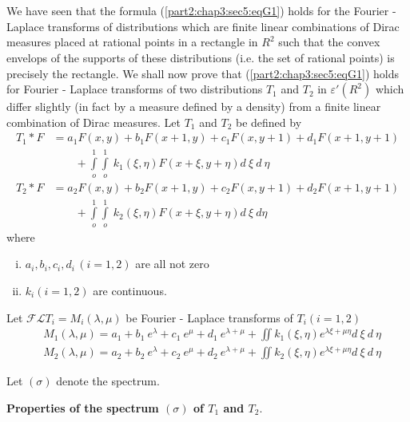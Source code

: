 \section{}\label{part2:chap3:sec8}%

We have seen that the formula (\ref{part2:chap3:sec5:eqG1}) holds for
the Fourier 
- Laplace transforms of distributions which are finite linear
combinations of Dirac measures placed at rational points in a
rectangle in $R^2$ such that the convex envelops of the supports of
these distributions (i.e. the set of rational points) is precisely the
rectangle. We shall now prove that (\ref{part2:chap3:sec5:eqG1}) holds
for Fourier 
- Laplace transforms of two distributions $T_1$ and $T_2$ in
$\varepsilon'(R^2)$ which differ slightly (in fact by a measure
defined by a density) from a finite linear combination of Dirac
measures. Let $T_1$ and $T_2$ be defined by  
\begin{align*}
  T_1 * F & = a_1 F(x,y)  + b_1 F(x + 1, y) + c_1 F(x,y+1) + d_1
  F(x+1, y+1)\\ 
  & \qquad + \int\limits_o^1 \int\limits_o^1 ~ k_1 (\xi, \eta) F(x+
  \xi, y+ \eta) d ~ \xi ~ d ~ \eta\\
  T_2 * F & = a_2 F(x,y) + b_2 F(x+1,y) + c_2 F(x,y + 1) + d_2
  F(x+1,y+1)\\ 
  & \qquad + \int\limits_o^1 \int\limits_o^1 ~ k_2 (\xi,\eta) F(x +
  \xi, y+ \eta) d ~ \xi ~ d \eta 
\end{align*}
where\pageoriginale 
\begin{enumerate}[i)]
\item $a_i,b_i,c_i, d_i \,(i = 1,2)$ are all not zero
\item $k_i (i = 1,2)$ are continuous.
\end{enumerate}

Let $\mathscr{F}\mathscr{L}T_i = M_i (\lambda, \mu)$ be Fourier -
Laplace transforms of \break $T_i(i=1,2)$ 
\begin{align*}
  & M_1 (\lambda,\mu) = a_1 + b_1 ~ e^\lambda + c_1 ~ e^\mu + d_1 ~
  e^{\lambda + \mu} + \iint k_1 (\xi, \eta) e^{\lambda \xi + \mu \eta}
  d ~ \xi ~ d ~ \eta\\ 
  & M_2 (\lambda,\mu) = a_2 + b_2 ~ e^\lambda + c_2 ~ e^{\mu} + d_2 ~
  e^{\lambda + \mu} + \iint k_2 (\xi,\eta) e^{\lambda \xi + \mu \eta}
  d ~ \xi ~ d ~ \eta 
\end{align*}

Let $(\sigma)$ denote the spectrum.

\noindent
\textbf{Properties of the spectrum $(\sigma)$ of $T_1$ and $T_2$}.

